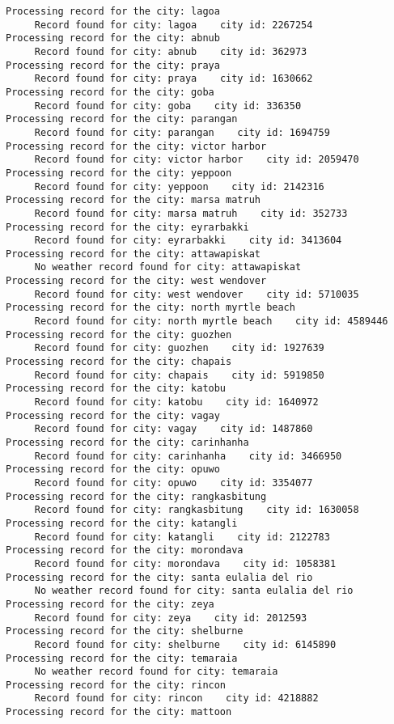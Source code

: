 \documentclass[11pt]{article}
\begin{document}
\begin{Verbatim}[commandchars=\\\{\}]
Processing record for the city: lagoa
     Record found for city: lagoa    city id: 2267254
Processing record for the city: abnub
     Record found for city: abnub    city id: 362973
Processing record for the city: praya
     Record found for city: praya    city id: 1630662
Processing record for the city: goba
     Record found for city: goba    city id: 336350
Processing record for the city: parangan
     Record found for city: parangan    city id: 1694759
Processing record for the city: victor harbor
     Record found for city: victor harbor    city id: 2059470
Processing record for the city: yeppoon
     Record found for city: yeppoon    city id: 2142316
Processing record for the city: marsa matruh
     Record found for city: marsa matruh    city id: 352733
Processing record for the city: eyrarbakki
     Record found for city: eyrarbakki    city id: 3413604
Processing record for the city: attawapiskat
     No weather record found for city: attawapiskat
Processing record for the city: west wendover
     Record found for city: west wendover    city id: 5710035
Processing record for the city: north myrtle beach
     Record found for city: north myrtle beach    city id: 4589446
Processing record for the city: guozhen
     Record found for city: guozhen    city id: 1927639
Processing record for the city: chapais
     Record found for city: chapais    city id: 5919850
Processing record for the city: katobu
     Record found for city: katobu    city id: 1640972
Processing record for the city: vagay
     Record found for city: vagay    city id: 1487860
Processing record for the city: carinhanha
     Record found for city: carinhanha    city id: 3466950
Processing record for the city: opuwo
     Record found for city: opuwo    city id: 3354077
Processing record for the city: rangkasbitung
     Record found for city: rangkasbitung    city id: 1630058
Processing record for the city: katangli
     Record found for city: katangli    city id: 2122783
Processing record for the city: morondava
     Record found for city: morondava    city id: 1058381
Processing record for the city: santa eulalia del rio
     No weather record found for city: santa eulalia del rio
Processing record for the city: zeya
     Record found for city: zeya    city id: 2012593
Processing record for the city: shelburne
     Record found for city: shelburne    city id: 6145890
Processing record for the city: temaraia
     No weather record found for city: temaraia
Processing record for the city: rincon
     Record found for city: rincon    city id: 4218882
Processing record for the city: mattoon

\end{Verbatim}
\end{document}
